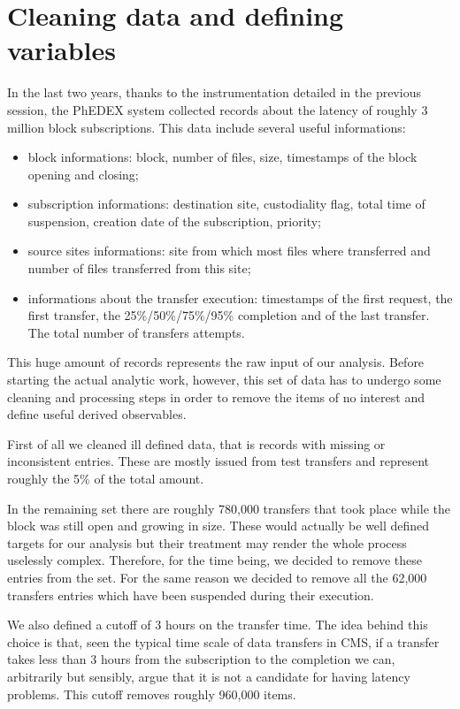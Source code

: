 \section{Cleaning data and defining variables}

In the last two years, thanks to the instrumentation detailed in the
previous session, the PhEDEX system collected records about the
latency of roughly 3 million block subscriptions.  This data include
several useful informations:

\begin{itemize}
\item block informations: block, number of files, size, timestamps of
    the block opening and closing;
\item subscription informations: destination site, custodiality flag,
    total time of suspension, creation date of the subscription,
    priority;
\item source sites informations: site from which most files where
    transferred and number of files transferred from this site;

\item informations about the transfer execution: timestamps of the first
    request, the first transfer, the 25\%/50\%/75\%/95\% completion and of
    the last transfer. The total number of transfers attempts.
\end{itemize}

This huge amount of records represents the raw input of our
analysis. Before starting the actual analytic work, however, this set
of data has to undergo some cleaning and processing steps in order to
remove the items of no interest and define useful derived observables.

First of all we cleaned ill defined data, that is records with missing
or inconsistent entries. These are mostly issued from test transfers
and represent roughly the 5\% of the total amount.

In the remaining set there are roughly 780,000 transfers that took
place while the block was still open and growing in size. These would
actually be well defined targets for our analysis but their treatment
may render the whole process uselessly complex. Therefore, for the
time being, we decided to remove these entries from the set. For the
same reason we decided to remove all the 62,000 transfers entries
which have been suspended during their execution.

We also defined a cutoff of 3 hours on the transfer time. The idea
behind this choice is that, seen the typical time scale of data
transfers in CMS, if a transfer takes less than 3 hours from the
subscription to the completion we can, arbitrarily but sensibly, argue
that it is not a candidate for having latency problems. This cutoff
removes roughly 960,000 items.

